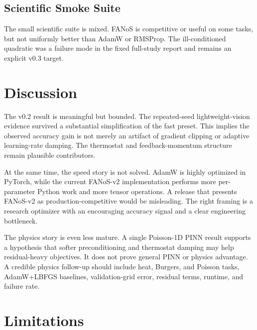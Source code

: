 \documentclass[11pt]{article}
\begin{document}
\subsection{Scientific Smoke Suite}

The small scientific suite is mixed. FANoS is competitive or useful on some tasks, but not uniformly better than AdamW or RMSProp. The ill-conditioned quadratic was a failure mode in the fixed full-study report and remains an explicit v0.3 target.

\begin{table}[h]
\centering
\caption{Selected scientific smoke results from the fixed full-study run. Lower metric is better except sequence-memory accuracy where higher is better. This is diagnostic evidence, not a broad scientific-ML benchmark.}
\label{tab:scientific}
\resizebox{\textwidth}{!}{}
\end{table}

\section{Discussion}

The v0.2 result is meaningful but bounded. The repeated-seed lightweight-vision evidence survived a substantial simplification of the fast preset. This implies the observed accuracy gain is not merely an artifact of gradient clipping or adaptive learning-rate damping. The thermostat and feedback-momentum structure remain plausible contributors.

At the same time, the speed story is not solved. AdamW is highly optimized in PyTorch, while the current FANoS-v2 implementation performs more per-parameter Python work and more tensor operations. A release that presents FANoS-v2 as production-competitive would be misleading. The right framing is a research optimizer with an encouraging accuracy signal and a clear engineering bottleneck.

The physics story is even less mature. A single Poisson-1D PINN result supports a hypothesis that softer preconditioning and thermostat damping may help residual-heavy objectives. It does not prove general PINN or physics advantage. A credible physics follow-up should include heat, Burgers, and Poisson tasks, AdamW+LBFGS baselines, validation-grid error, residual terms, runtime, and failure rate.

\section{Limitations}
\end{document}
